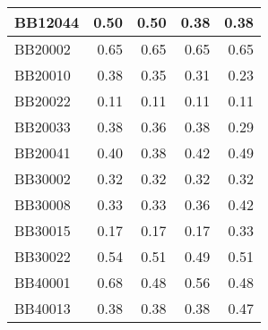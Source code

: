 \begin{table}[htbp]
\begin{tabular}{|l|r|r|r|r|}
		\hline
		BB12044 & \cellcolor[rgb]{ .988,  1,  .992}0.50 & \cellcolor[rgb]{ .988,  1,  .992}0.50 & \cellcolor[rgb]{ .384,  .745,  .478}0.38 & \cellcolor[rgb]{ .384,  .745,  .478}0.38 \\
		\hline
		BB20002 & \cellcolor[rgb]{ .988,  1,  .992}0.65 & \cellcolor[rgb]{ .988,  1,  .992}0.65 & \cellcolor[rgb]{ .988,  1,  .992}0.65 & \cellcolor[rgb]{ .988,  1,  .992}0.65 \\
		\hline
		BB20010 & \cellcolor[rgb]{ .988,  1,  .992}0.38 & \cellcolor[rgb]{ .835,  .933,  .863}0.35 & \cellcolor[rgb]{ .686,  .871,  .733}0.31 & \cellcolor[rgb]{ .384,  .745,  .478}0.23 \\
		\hline
		BB20022 & \cellcolor[rgb]{ .988,  1,  .992}0.11 & \cellcolor[rgb]{ .988,  1,  .992}0.11 & \cellcolor[rgb]{ .988,  1,  .992}0.11 & \cellcolor[rgb]{ .988,  1,  .992}0.11 \\
		\hline
		BB20033 & \cellcolor[rgb]{ .988,  1,  .992}0.38 & \cellcolor[rgb]{ .835,  .933,  .863}0.36 & \cellcolor[rgb]{ .988,  1,  .992}0.38 & \cellcolor[rgb]{ .384,  .745,  .478}0.29 \\
		\hline
		BB20041 & \cellcolor[rgb]{ .502,  .792,  .58}0.40 & \cellcolor[rgb]{ .384,  .745,  .478}0.38 & \cellcolor[rgb]{ .624,  .843,  .682}0.42 & \cellcolor[rgb]{ .988,  1,  .992}0.49 \\
		\hline
		BB30002 & \cellcolor[rgb]{ .988,  1,  .992}0.32 & \cellcolor[rgb]{ .988,  1,  .992}0.32 & \cellcolor[rgb]{ .988,  1,  .992}0.32 & \cellcolor[rgb]{ .988,  1,  .992}0.32 \\
		\hline
		BB30008 & \cellcolor[rgb]{ .384,  .745,  .478}0.33 & \cellcolor[rgb]{ .384,  .745,  .478}0.33 & \cellcolor[rgb]{ .584,  .827,  .647}0.36 & \cellcolor[rgb]{ .988,  1,  .992}0.42 \\
		\hline
		BB30015 & \cellcolor[rgb]{ .384,  .745,  .478}0.17 & \cellcolor[rgb]{ .384,  .745,  .478}0.17 & \cellcolor[rgb]{ .384,  .745,  .478}0.17 & \cellcolor[rgb]{ .988,  1,  .992}0.33 \\
		\hline
		BB30022 & \cellcolor[rgb]{ .988,  1,  .992}0.54 & \cellcolor[rgb]{ .584,  .827,  .647}0.51 & \cellcolor[rgb]{ .384,  .745,  .478}0.49 & \cellcolor[rgb]{ .584,  .827,  .647}0.51 \\
		\hline
		BB40001 & \cellcolor[rgb]{ .988,  1,  .992}0.68 & \cellcolor[rgb]{ .384,  .745,  .478}0.48 & \cellcolor[rgb]{ .624,  .847,  .682}0.56 & \cellcolor[rgb]{ .384,  .745,  .478}0.48 \\
		\hline
		BB40013 & \cellcolor[rgb]{ .384,  .745,  .478}0.38 & \cellcolor[rgb]{ .384,  .745,  .478}0.38 & \cellcolor[rgb]{ .384,  .745,  .478}0.38 & \cellcolor[rgb]{ .988,  1,  .992}0.47 \\

\end{tabular}
\end{table}
